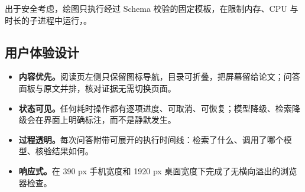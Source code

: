\vspace{6pt}
出于安全考虑，绘图只执行经过 Schema 校验的固定模板，在限制内存、CPU 与时长的子进程中运行，。

\subsection{用户体验设计}

\begin{itemize}
  \item \textbf{内容优先。}阅读页左侧只保留图标导航，目录可折叠，把屏幕留给论文；问答面板与原文并排，核对证据无需切换页面。
  \item \textbf{状态可见。}任何耗时操作都有逐项进度、可取消、可恢复；模型降级、检索降级会在界面上明确标注，而不是静默发生。
  \item \textbf{过程透明。}每次问答附带可展开的执行时间线：检索了什么、调用了哪个模型、核验结果如何。
  \item \textbf{响应式。}在 390 px 手机宽度和 1920 px 桌面宽度下完成了无横向溢出的浏览器检查。
\end{itemize}
